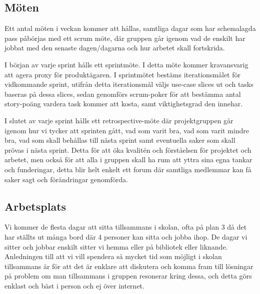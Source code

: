 \documentclass[11pt]{article}
\begin{document}
\subsection{Möten}
\label{sec:org8420447}
Ett antal möten i veckan kommer att hållas, samtliga dagar som har
schemalagda pass påbörjas med ett scrum möte, där gruppen går igenom vad
de enskilt har jobbat med den senaste dagen/dagarna och hur arbetet
skall fortskrida.

I början av varje sprint hålls ett sprintmöte. I detta möte kommer
kravansvarig att agera proxy för produktägaren. I sprintmötet bestäms
iterationsmålet för vidkommande sprint, utifrån detta iterationsmål
väljs use-case slices ut och tasks baseras på dessa slices, sedan
genomförs scrum-poker för att bestämma antal story-poäng vardera task
kommer att kosta, samt viktighetsgrad den innehar.

I slutet av varje sprint hålls ett retrospective-möte där projektgruppen
går igenom hur vi tycker att sprinten gått, vad som varit bra, vad som
varit mindre bra, vad som skall behållas till nästa sprint samt
eventuella saker som skall prövas i nästa sprint. Detta för att öka
kvalitén och förståelsen för projektet och arbetet, men också för att
alla i gruppen skall ha rum att yttra sina egna tankar och funderingar,
detta blir helt enkelt ett forum där samtliga medlemmar kan få saker
sagt och förändringar genomförda.

\subsection{Arbetsplats}
\label{sec:org5a41658}
Vi kommer de flesta dagar att sitta tillsammans i skolan, ofta på plan 3
då det har ställts ut många bord där 4 personer kan sitta och jobba
ihop. De dagar vi sitter och jobbar enskilt sitter vi hemma eller på
bibliotek eller liknande. Anledningen till att vi vill spendera så
mycket tid som möjligt i skolan tillsammans är för att det är enklare
att diskutera och komma fram till lösningar på problem om man
tillsammans i gruppen resonerar kring dessa, och detta görs enklast och
bäst i person och ej över internet.
\end{document}

